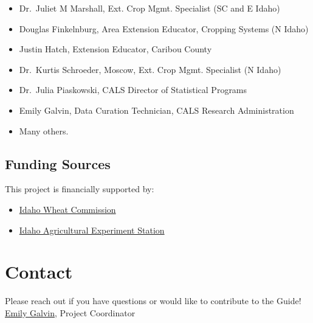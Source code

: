 \documentclass[
  letterpaper,
  DIV=11,
  numbers=noendperiod]{scrreprt}
\providecommand{\tightlist}{%
  \setlength{\itemsep}{0pt}\setlength{\parskip}{0pt}}\usepackage{longtable,booktabs,array}
\begin{document}
\begin{itemize}
\tightlist
\item
  Dr.~Juliet M Marshall, Ext. Crop Mgmt. Specialist (SC and E Idaho)\\
\item
  Douglas Finkelnburg, Area Extension Educator, Cropping Systems (N
  Idaho)\\
\item
  Justin Hatch, Extension Educator, Caribou County\\
\item
  Dr.~Kurtis Schroeder, Moscow, Ext. Crop Mgmt. Specialist (N Idaho)\\
\item
  Dr.~Julia Piaskowski, CALS Director of Statistical Programs\\
\item
  Emily Galvin, Data Curation Technician, CALS Research Administration\\
\item
  Many others.
\end{itemize}

\subsection*{Funding Sources}\label{funding-sources}

This project is financially supported by:

\begin{itemize}
\tightlist
\item
  \href{https://www.idahowheat.org/}{Idaho Wheat Commission}\\
\item
  \href{https://www.uidaho.edu/cals/idaho-agricultural-experiment-station}{Idaho
  Agricultural Experiment Station}
\end{itemize}

\section*{Contact}\label{contact}


Please reach out if you have questions or would like to contribute to
the Guide!\\
\href{mailto:egalvin@uidaho.edu}{Emily Galvin}, Project Coordinator

\end{document}
